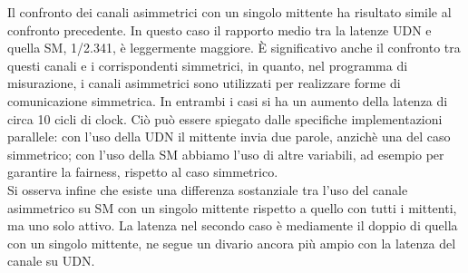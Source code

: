 Il confronto dei canali asimmetrici con un singolo mittente ha risultato simile al confronto precedente. In questo caso il rapporto medio tra la latenze UDN e quella SM, 1/2.341, \`e leggermente maggiore. \`E significativo anche il confronto tra questi canali e i corrispondenti simmetrici, in quanto, nel programma di misurazione, i canali asimmetrici sono utilizzati per realizzare forme di comunicazione simmetrica. In entrambi i casi si ha un aumento della latenza di circa 10 cicli di clock. Ci\`o pu\`o essere spiegato dalle specifiche implementazioni parallele: con l'uso della UDN il mittente invia due parole, anzich\`e una del caso simmetrico; con l'uso della SM abbiamo l'uso di altre variabili, ad esempio per garantire la fairness, rispetto al caso simmetrico. \\
Si osserva infine che esiste una differenza sostanziale tra l'uso del canale asimmetrico su SM con un singolo mittente rispetto a quello con tutti i mittenti, ma uno solo attivo. La latenza nel secondo caso \`e mediamente il doppio di quella con un singolo mittente, ne segue un divario ancora pi\`u ampio con la latenza del canale su UDN.\\













  
\FloatBarrier



